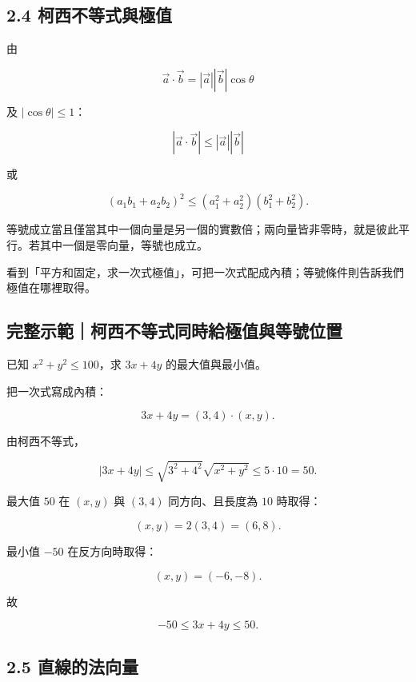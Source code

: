 \documentclass[11pt,a4paper]{article}
\begin{document}
\subsection{2.4 柯西不等式與極值}\label{ux67efux897fux4e0dux7b49ux5f0fux8207ux6975ux503c}

由

\[
\vec a\cdot\vec b=|\vec a||\vec b|\cos\theta
\]

及 \(|\cos\theta|\le1\)：

\[
\boxed{
|\vec a\cdot\vec b|
\le|\vec a||\vec b|
}
\]

或

\[
\boxed{
(a_1b_1+a_2b_2)^2
\le(a_1^2+a_2^2)(b_1^2+b_2^2)
}.
\]

等號成立當且僅當其中一個向量是另一個的實數倍；兩向量皆非零時，就是彼此平行。若其中一個是零向量，等號也成立。

看到「平方和固定，求一次式極值」，可把一次式配成內積；等號條件則告訴我們極值在哪裡取得。

\begin{HandoutWorkedExample}

\subsection{完整示範｜柯西不等式同時給極值與等號位置}\label{ux5b8cux6574ux793aux7bc4ux67efux897fux4e0dux7b49ux5f0fux540cux6642ux7d66ux6975ux503cux8207ux7b49ux865fux4f4dux7f6e}

已知 \(x^2+y^2\le100\)，求 \(3x+4y\) 的最大值與最小值。

把一次式寫成內積：

\[
3x+4y=(3,4)\cdot(x,y).
\]

由柯西不等式，

\[
|3x+4y|
\le\sqrt{3^2+4^2}\sqrt{x^2+y^2}
\le5\cdot10=50.
\]

最大值 \(50\) 在 \((x,y)\) 與 \((3,4)\) 同方向、且長度為 \(10\) 時取得：

\[
(x,y)=2(3,4)=(6,8).
\]

最小值 \(-50\) 在反方向時取得：

\[
(x,y)=(-6,-8).
\]

故

\[
\boxed{-50\le3x+4y\le50}.
\]

\end{HandoutWorkedExample}

\subsection{2.5 直線的法向量}\label{ux76f4ux7ddaux7684ux6cd5ux5411ux91cf}
\end{document}
